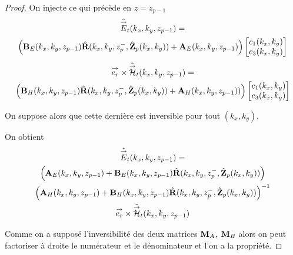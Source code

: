 \begin{proof}
      On injecte ce qui précède en \(z = z_{p-1}\)
      \begin{multline*}
        \hat{{\overset{\rightarrow}{E}}}_t(k_x,k_y,z_{p-1}) = 
        \\
        \left(\mathbf{B}_{E}(k_x,k_y,z_{p-1})\hat{\mathbf{R}}(k_x,k_y,z_p^-,\hat{\mathbf{Z}}_p(k_x,k_y)) + \mathbf{A}_{E}(k_x,k_y,z_{p-1})\right)
        \begin{bmatrix}
          c_1(k_x,k_y) \\
          c_3(k_x,k_y)
        \end{bmatrix}
      \end{multline*}        
      \begin{multline*}
        {\overset{\rightarrow}{e_r}}\times\hat{{\overset{\rightarrow}{\mathcal{H}}}}_t(k_x,k_y,z_{p-1}) =
        \\
        \left(\mathbf{B}_{H}(k_x,k_y,z_{p-1})\hat{\mathbf{R}}(k_x,k_y,z_p^-,\hat{\mathbf{Z}}_p(k_x,k_y)) + \mathbf{A}_{H}(k_x,k_y,z_{p-1}))\right)
        \begin{bmatrix}
          c_1(k_x,k_y) \\
          c_3(k_x,k_y)
        \end{bmatrix}
      \end{multline*}

      On suppose alors que cette dernière est inversible pour tout \((k_x,k_y)\).

      On obtient
      \begin{multline*}
        \hat{{\overset{\rightarrow}{E}}}_t(k_x,k_y,z_{p-1}) =
        \\
        \left(\mathbf{A}_{E}(k_x,k_y,z_{p-1}) + \mathbf{B}_{E}(k_x,k_y,z_{p-1})\hat{\mathbf{R}}(k_x,k_y,z_p^-,\hat{\mathbf{Z}}_p(k_x,k_y))\right) \\
        \left(\mathbf{A}_{H}(k_x,k_y,z_{p-1}) + \mathbf{B}_{H}(k_x,k_y,z_{p-1})\hat{\mathbf{R}}(k_x,k_y,z_p^-,\hat{\mathbf{Z}}_p(k_x,k_y))\right)^{-1}
        \\
        {\overset{\rightarrow}{e_r}}\times\hat{{\overset{\rightarrow}{\mathcal{H}}}}_t(k_x,k_y,z_{p-1})
      \end{multline*}

      Comme on a supposé l'inversibilité des deux matrices \(\mathbf{M}_{A}\), \(\mathbf{M}_{B}\) alors on peut factoriser à droite le numérateur et le dénominateur et l’on a la propriété.
    \end{proof}

